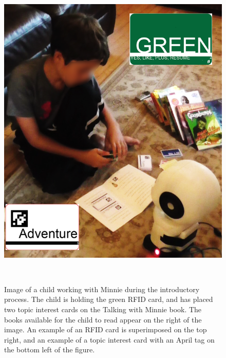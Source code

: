 \documentclass{sigchi}
\begin{document}
\begin{figure}[bpt]
	\centering
	\includegraphics[width=1\columnwidth]{figures/childWithMinnie}
	\caption{Image of a child working with Minnie during the introductory process. The child is holding the green RFID card, and has placed two topic interest cards on the Talking with Minnie book. The books available for the child to read appear on the right of the image. An example of an RFID card is superimposed on the top right, and an example of a topic interest card with an April tag on the bottom left of the figure.}~\label{fig:figure3}
\end{figure}
\end{document}
